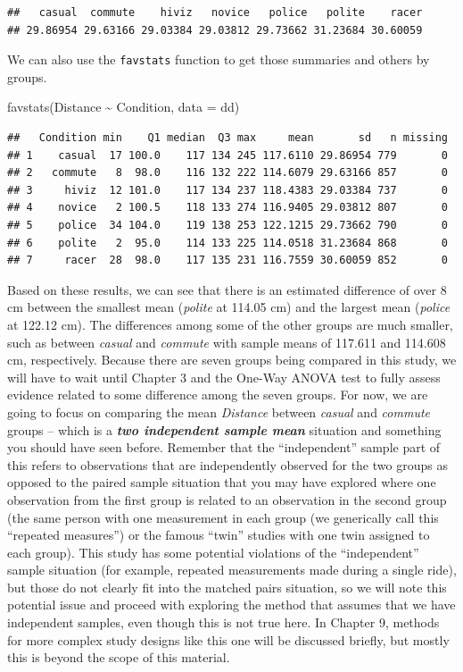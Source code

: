 \documentclass[
]{book}
\newenvironment{Shaded}{\begin{snugshade}}{\end{snugshade}}
\newcommand{\AttributeTok}[1]{\textcolor[rgb]{0.77,0.63,0.00}{#1}}
\newcommand{\FunctionTok}[1]{\textcolor[rgb]{0.00,0.00,0.00}{#1}}
\newcommand{\NormalTok}[1]{#1}
\newcommand{\SpecialCharTok}[1]{\textcolor[rgb]{0.00,0.00,0.00}{#1}}
\begin{document}
\begin{verbatim}
##   casual  commute    hiviz   novice   police   polite    racer 
## 29.86954 29.63166 29.03384 29.03812 29.73662 31.23684 30.60059
\end{verbatim}

We can also use the \texttt{favstats} function to get those summaries and others by groups.

\begin{Shaded}
\begin{Highlighting}[]
\FunctionTok{favstats}\NormalTok{(Distance }\SpecialCharTok{\textasciitilde{}}\NormalTok{ Condition, }\AttributeTok{data =}\NormalTok{ dd)}
\end{Highlighting}
\end{Shaded}

\begin{verbatim}
##   Condition min    Q1 median  Q3 max     mean       sd   n missing
## 1    casual  17 100.0    117 134 245 117.6110 29.86954 779       0
## 2   commute   8  98.0    116 132 222 114.6079 29.63166 857       0
## 3     hiviz  12 101.0    117 134 237 118.4383 29.03384 737       0
## 4    novice   2 100.5    118 133 274 116.9405 29.03812 807       0
## 5    police  34 104.0    119 138 253 122.1215 29.73662 790       0
## 6    polite   2  95.0    114 133 225 114.0518 31.23684 868       0
## 7     racer  28  98.0    117 135 231 116.7559 30.60059 852       0
\end{verbatim}

\indent Based on these results, we can see that there is an estimated difference of over 8 cm between the smallest mean (\emph{polite} at 114.05 cm) and the largest mean (\emph{police} at 122.12 cm). The differences among some of the other groups are much smaller, such as between \emph{casual} and \emph{commute} with sample means of 117.611 and 114.608 cm, respectively. Because there are seven groups being compared in this study, we will have to
wait until Chapter 3 and the One-Way ANOVA test to fully assess evidence
related to some difference among the seven groups. For now, we are going to
focus on comparing the mean \emph{Distance} between \emph{casual} and \emph{commute} groups
-- which is a \textbf{\emph{two independent sample mean}} situation and something you
should have seen before. Remember that the ``independent'' sample part of
this refers to observations that are independently observed for the two
groups as opposed to the paired sample situation that you may have
explored where one observation from the first group is related to an
observation in the second group (the same person with one measurement in each group (we
generically call this ``repeated measures'')
or the famous ``twin'' studies with one twin assigned to each group).  This study has some potential violations of the ``independent'' sample situation (for example, repeated measurements made during a single ride), but those do not clearly fit into the matched pairs situation, so we will note this potential issue and proceed with exploring the method that assumes that we have independent samples, even though this is not true here. In Chapter 9, methods for more complex study designs like this one will be discussed briefly, but mostly this is beyond the scope of this material.
\end{document}
